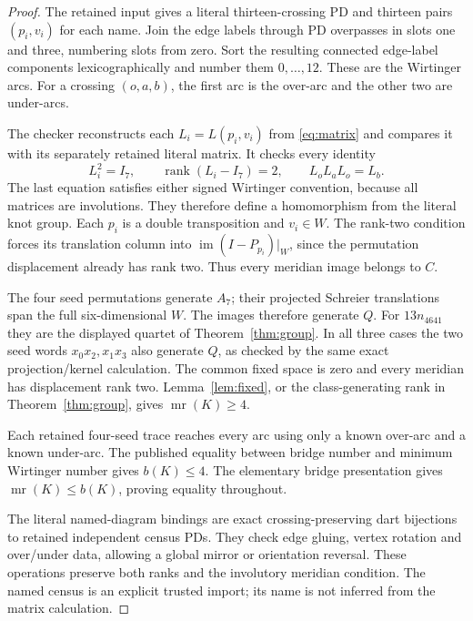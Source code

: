 \documentclass[11pt]{article}
\newcommand{\mr}{\operatorname{mr}}
\newcommand{\rk}{\operatorname{rank}}
\begin{document}
\begin{proof}
The retained input gives a literal thirteen-crossing PD and thirteen
pairs $(p_i,v_i)$ for each name. Join the edge labels through PD
overpasses in slots one and three, numbering slots from zero.
Sort the resulting connected edge-label components lexicographically
and number them $0,\ldots,12$. These are the Wirtinger arcs.
For a crossing $(o,a,b)$, the first arc is the over-arc and the
other two are under-arcs.

The checker reconstructs each $L_i=L(p_i,v_i)$ from
\eqref{eq:matrix} and compares it with its separately retained literal
matrix. It checks every identity
\[
               L_i^2=I_7,\qquad\rk(L_i-I_7)=2,\qquad
               L_oL_aL_o=L_b.
\]
The last equation satisfies either signed Wirtinger convention,
because all matrices are involutions. They therefore define a
homomorphism from the literal knot group.
Each $p_i$ is a double transposition and $v_i\in W$.
The rank-two condition forces its translation column into
$\operatorname{im}(I-P_{p_i})|_W$, since the permutation displacement
already has rank two. Thus every meridian image belongs to $C$.

The four seed permutations generate $A_7$; their projected Schreier
translations span the full six-dimensional $W$. The images therefore
generate $Q$. For $13n_{4641}$ they are the displayed quartet of
Theorem~\ref{thm:group}. In all three cases the two seed words
$x_0x_2,x_1x_3$ also generate $Q$, as checked by the same exact
projection/kernel calculation.
The common fixed space is zero and every meridian has displacement
rank two. Lemma~\ref{lem:fixed}, or the class-generating rank in
Theorem~\ref{thm:group}, gives $\mr(K)\ge4$.

Each retained four-seed trace reaches every arc using only a known
over-arc and a known under-arc. The published equality between bridge
number and minimum Wirtinger number \cite[Definition~1.2 and
Theorem~1.3]{bkvv} gives $b(K)\le4$. The elementary bridge
presentation gives $\mr(K)\le b(K)$, proving equality throughout.

The literal named-diagram bindings are exact crossing-preserving
dart bijections to retained independent census PDs. They check edge
gluing, vertex rotation and over/under data, allowing a global mirror
or orientation reversal. These operations preserve both ranks and
the involutory meridian condition. The named census is an explicit
trusted import; its name is not inferred from the matrix calculation.
\end{proof}
\end{document}
